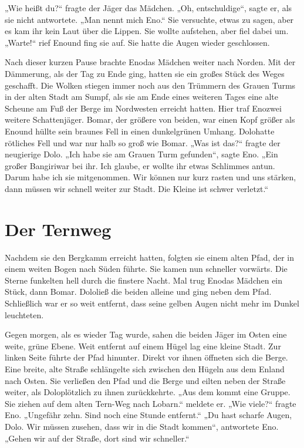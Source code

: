 \documentclass[12pt,a4paper,onecolumn,twoside,ngerman]{book}
\newcommand{\Tern}{Tern}
\newcommand{\Bangiri}{Bangiri}
\newcommand{\Eno}{Eno}
\newcommand{\Bomar}{Bomar}
\newcommand{\Do}{Dolo}
\newcommand{\Lobarn}{Lobarn}
\begin{document}
„Wie heißt du?“ fragte der Jäger das Mädchen. „Oh, entschuldige“, sagte er, als sie nicht antwortete. „Man nennt mich \Eno.“ Sie versuchte, etwas zu sagen, aber es kam ihr kein Laut über die Lippen. Sie wollte aufstehen, aber fiel dabei um. „Warte!“ rief \Eno und fing sie auf. Sie hatte die Augen wieder geschlossen.

Nach dieser kurzen Pause brachte \Eno das Mädchen weiter nach Norden. Mit der Dämmerung, als der Tag zu Ende ging, hatten sie ein großes Stück des Weges geschafft. Die Wolken stiegen immer noch aus den Trümmern des Grauen Turms in der alten Stadt am Sumpf, als sie am Ende eines weiteren Tages eine alte Scheune am Fuß der Berge im Nordwesten erreicht hatten. Hier traf \Eno zwei weitere Schattenjäger. \Bomar, der größere von beiden, war einen Kopf größer als \Eno und hüllte sein braunes Fell in einen dunkelgrünen Umhang. \Do hatte rötliches Fell und war nur halb so groß wie \Bomar. 
„Was ist das?“ fragte der neugierige \Do. 
„Ich habe sie am Grauen Turm gefunden“, sagte \Eno. „Ein großer \Bangiri war bei ihr. Ich glaube, er wollte ihr etwas Schlimmes antun. Darum habe ich sie mitgenommen. Wir können nur kurz rasten und uns stärken, dann müssen wir schnell weiter zur Stadt. Die Kleine ist schwer verletzt.“

\section{Der Ternweg}
Nachdem sie den Bergkamm erreicht hatten, folgten sie einem alten Pfad, der in einem weiten Bogen nach Süden führte. Sie kamen nun schneller vorwärts. Die Sterne funkelten hell durch die finstere Nacht. Mal trug \Eno das Mädchen ein Stück, dann \Bomar. \Do ließ die beiden alleine und ging neben dem Pfad. Schließlich war er so weit entfernt, dass seine gelben Augen nicht mehr im Dunkel leuchteten.

Gegen morgen, als es wieder Tag wurde, sahen die beiden Jäger im Osten eine weite, grüne Ebene. Weit entfernt auf einem Hügel lag eine kleine Stadt. Zur linken Seite führte der Pfad hinunter. Direkt vor ihnen öffneten sich die Berge. Eine breite, alte Straße schlängelte sich zwischen den Hügeln aus dem Enland nach Osten. Sie verließen den Pfad und die Berge und eilten neben der Straße weiter, als \Do plötzlich zu ihnen zurückkehrte. „Aus dem \Enland kommt eine Gruppe. Sie ziehen auf dem alten \Tern{-Weg} nach \Lobarn.“ meldete er. „Wie viele?“ fragte \Eno. „Ungefähr zehn. Sind noch eine Stunde entfernt.“ „Du hast scharfe Augen, \Do. Wir müssen zusehen, dass wir in die Stadt kommen“, antwortete \Eno. „Gehen wir auf der Straße, dort sind wir schneller.“
\end{document}
